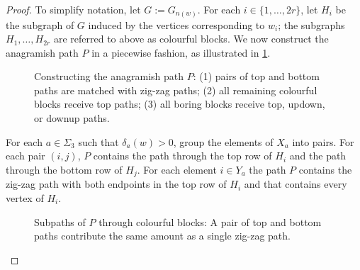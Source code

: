 \documentclass{patmorin}
\begin{document}
\begin{proof}
    To simplify notation, let $G:=G_{n(w)}$.  For each $i\in\{1,\ldots,2r\}$, let $H_i$ be the subgraph of $G$ induced by the vertices corresponding to $w_i$; the subgraphs $H_1,\ldots,H_{2r}$ are referred to above as colourful blocks.  We now construct the anagramish path $P$ in a piecewise fashion, as illustrated in \cref{path_construction}. 
    \begin{figure}
        \caption{Constructing the anagramish path $P$:
            (1) pairs of top and bottom paths are matched with zig-zag paths;
            (2) all remaining colourful blocks receive top paths;
            (3) all boring blocks receive top, updown, or downup paths.
        }
        \label{path_construction}
    \end{figure}
    \begin{compactenum}
        \item For each $a\in\Sigma_3$ such that $\delta_a(w)>0$, group the elements of $X_a$ into pairs.  For each pair $(i,j)$, $P$ contains the path through the top row of $H_i$ and the path through the bottom row of $H_j$.  For each element $i\in Y_a$ the path $P$ contains the zig-zag path with both endpoints in the top row of $H_i$ and that contains every vertex of $H_i$. 

        \begin{figure}
            \caption{Subpaths of $P$ through colourful blocks: A pair of top and bottom paths contribute the same amount as a single zig-zag path.}
            \label{paths}
        \end{figure}



\end{compactenum}
\end{proof}
\end{document}
